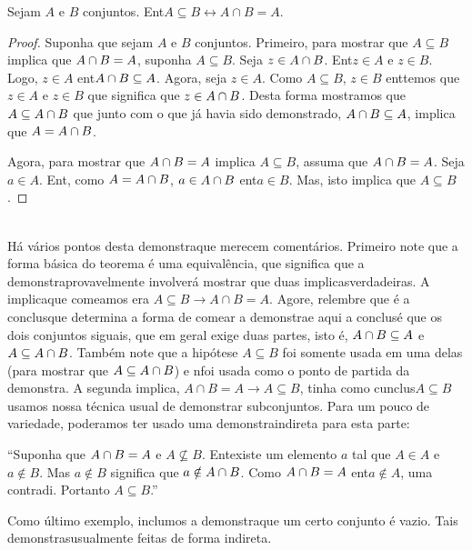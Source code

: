 \begin{teob}
Sejam $A$ e $B$ conjuntos. Ent\ao $A\subseteq B\leftrightarrow A\cap B=A.$
\end{teob}
\begin{proof} 
Suponha que sejam $A$ e $B$ conjuntos. Primeiro, para mostrar que $A\subseteq B$ implica que $A\cap B=A$, suponha $A\subseteq B$. Seja $z\in A\cap B$. Ent\ao $z\in A$ e $z\in B$. Logo, $z\in A$ ent\ao $A\cap B\subseteq A$. Agora, seja $z\in A$. Como $A\subseteq B$, $z\in B$ ent\ao temos que $z\in A$ e $z\in B$ que significa que $z\in A\cap B$. Desta forma mostramos que $A\subseteq A\cap B$ que junto com o que j\'a havia sido demonstrado, $A\cap B\subseteq A$, implica que $A=A\cap B$.

Agora, para mostrar que $A\cap B=A$ implica $A\subseteq B$, assuma que $A\cap B=A$. Seja $a\in A$. Ent\aoi, como $A=A\cap B$, $a\in A\cap B$ ent\ao $a\in B$. Mas, isto implica que $A\subseteq B$. 
\end{proof}
\\

H\'a v\'arios pontos desta demonstra\cao que merecem coment\'arios. Primeiro note que a forma b\'asica do teorema \'e uma equival\^encia, que significa que a demonstra\cao provavelmente involver\'a mostrar que duas implica\coes s\ao verdadeiras. A implica\cao que come\cc amos era $A\subseteq B\to A\cap B=A$. Agore, relembre que \'e a conclus\ao que determina a forma de come\cc ar a demonstra\cao e aqui a conclus\ao \'e que os dois conjuntos s\ao iguais, que em geral exige duas partes, isto \'e, $A\cap B\subseteq A$ e $A\subseteq A\cap B$. Tamb\'em note que a hip\'otese $A\subseteq B$ foi somente usada em uma delas (para mostrar que $A\subseteq A\cap B$) e n\ao foi usada como o ponto de partida da demonstra\caoi. A segunda implica\caoi, $A\cap B=A \to A\subseteq B$, tinha como cunclus\ao $A\subseteq B$ usamos nossa t\'ecnica usual de demonstrar subconjuntos. Para um pouco de variedade, poder\ih amos ter usado uma demonstra\cao indireta para esta parte: 

``Suponha que $A\cap B=A$ e $A\not\subseteq B$. Ent\ao existe um elemento $a$ tal que $A\in A$ e $a\notin B$. Mas $a\notin B$ significa que $a\notin A\cap B$. Como $A\cap B=A$ ent\ao $a\notin A$, uma contradi\caoi. Portanto $A\subseteq B$.''

Como \'ultimo exemplo, inclu\ih mos a demonstra\cao que um certo conjunto \'e vazio. Tais demonstra\coes s\ao usualmente feitas de forma indireta.


